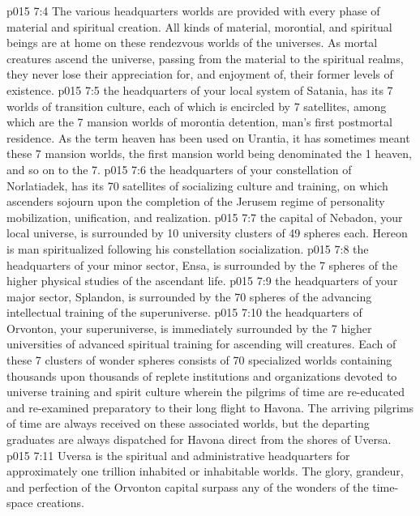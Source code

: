 \vs p015 7:4 The various headquarters worlds are provided with every phase of material and spiritual creation. All kinds of material, morontial, and spiritual beings are at home on these rendezvous worlds of the universes. As mortal creatures ascend the universe, passing from the material to the spiritual realms, they never lose their appreciation for, and enjoyment of, their former levels of existence.
\vs p015 7:5 \pc {} the headquarters of your local system of Satania, has its 7 worlds of transition culture, each of which is encircled by 7 satellites, among which are the 7 mansion worlds of morontia detention, man’s first postmortal residence. As the term heaven has been used on Urantia, it has sometimes meant these 7 mansion worlds, the first mansion world being denominated the 1 heaven, and so on to the 7.
\vs p015 7:6 \pc {} the headquarters of your constellation of Norlatiadek, has its 70 satellites of socializing culture and training, on which ascenders sojourn upon the completion of the Jerusem regime of personality mobilization, unification, and realization.
\vs p015 7:7 \pc {} the capital of Nebadon, your local universe, is surrounded by 10 university clusters of 49 spheres each. Hereon is man spiritualized following his constellation socialization.
\vs p015 7:8 \pc {} the headquarters of your minor sector, Ensa, is surrounded by the 7 spheres of the higher physical studies of the ascendant life.
\vs p015 7:9 \pc {} the headquarters of your major sector, Splandon, is surrounded by the 70 spheres of the advancing intellectual training of the superuniverse.
\vs p015 7:10 \pc {} the headquarters of Orvonton, your superuniverse, is immediately surrounded by the 7 higher universities of advanced spiritual training for ascending will creatures. Each of these 7 clusters of wonder spheres consists of 70 specialized worlds containing thousands upon thousands of replete institutions and organizations devoted to universe training and spirit culture wherein the pilgrims of time are re\hyp{}educated and re\hyp{}examined preparatory to their long flight to Havona. The arriving pilgrims of time are always received on these associated worlds, but the departing graduates are always dispatched for Havona direct from the shores of Uversa.
\vs p015 7:11 Uversa is the spiritual and administrative headquarters for approximately one trillion inhabited or inhabitable worlds. The glory, grandeur, and perfection of the Orvonton capital surpass any of the wonders of the time\hyp{}space creations.
